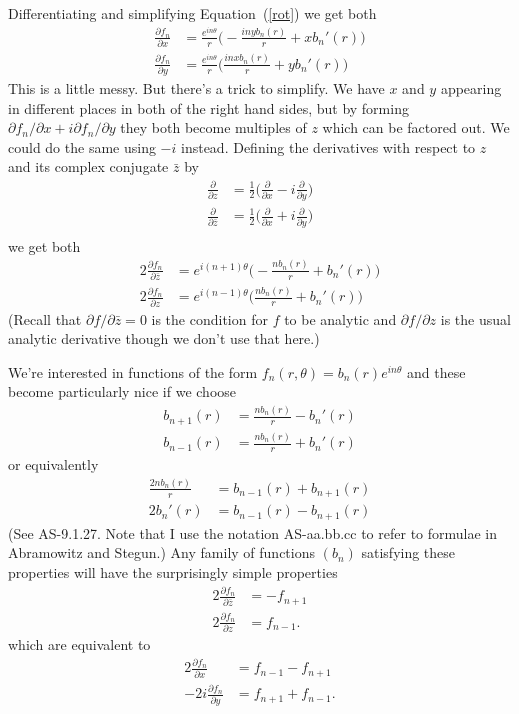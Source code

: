 \documentclass{article}
\begin{document}
Differentiating and simplifying Equation~(\ref{rot}) we get both
\begin{align}
\frac{\partial f_n}{\partial x} &= 
    \frac{e^{in\theta}}{r}\Big(-\frac{inyb_n(r)}{r}+xb_n'(r)\Big) \label{partialx}\\
\frac{\partial f_n}{\partial y} &= 
    \frac{e^{in\theta}}{r}\Big(\frac{inxb_n(r)}{r}+yb_n'(r)\Big) \label{partialy}
\end{align}
This is a little messy.
But there's a trick to simplify.
We have $x$ and $y$ appearing in different places in both of the right hand sides, but by forming $\partial f_n/\partial x+i\partial f_n/\partial y$ they both become multiples of $z$ which can be factored out.
We could do the same using $-i$ instead.
Defining the derivatives with respect to $z$ and its complex conjugate $\bar{z}$ by
\begin{align*}
\frac{\partial}{\partial z} &= \frac{1}{2}\Big(\frac{\partial}{\partial x}-i\frac{\partial}{\partial y}\Big)\\
\frac{\partial}{\partial\bar{z}} &= \frac{1}{2}\Big(\frac{\partial}{\partial x}+i\frac{\partial}{\partial y}\Big)\\
\end{align*}
we get both
\begin{align*}
2\frac{\partial f_n}{\partial\bar{z}} & = e^{i(n+1)\theta}
    \Big(-\frac{nb_n(r)}{r}+b_n'(r)\Big)\\
2\frac{\partial f_n}{\partial z} & = e^{i(n-1)\theta}
    \Big(\frac{nb_n(r)}{r}+b_n'(r)\Big)
\end{align*}
(Recall that $\partial f/\partial\bar{z}=0$ is the condition for $f$ to be analytic and $\partial f/\partial z$ is the usual analytic derivative though we don't use that here.)

We're interested in functions of the form
$f_n(r,\theta)=b_n(r)e^{in\theta}$
and these become particularly nice if we choose
\begin{align*}
b_{n+1}(r) & = \frac{nb_n(r)}{r}-b_n'(r) \\
b_{n-1}(r) & = \frac{nb_n(r)}{r}+b_n'(r)
\end{align*}
or equivalently
\begin{align}
\frac{2nb_n(r)}{r} & =  b_{n-1}(r)+b_{n+1}(r) \label{sum} \\
2b_n'(r) & =  b_{n-1}(r)-b_{n+1}(r) \label{deriv}
\end{align}
(See AS-9.1.27. Note that I use the notation AS-aa.bb.cc to refer to formulae in Abramowitz and Stegun.)
Any family of functions $(b_n)$ satisfying these properties will have the surprisingly simple properties
\begin{align*}
2\frac{\partial f_n}{\partial\bar{z}} & = -f_{n+1} \\
2\frac{\partial f_n}{\partial z} & = f_{n-1}.
\end{align*}
which are equivalent to
\begin{align}
2\frac{\partial f_n}{\partial x} & = f_{n-1}-f_{n+1} \label{sum3} \\
-2i\frac{\partial f_n}{\partial y} & = f_{n+1}+f_{n-1} \label{sum4}.
\end{align}
\end{document}

